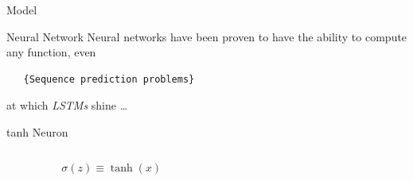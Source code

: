 \documentclass[10pt]{beamer}
\begin{document}
{
\begin{frame}[fragile]{Model}
 \par
\end{frame}
}

\begin{frame}[fragile]{Neural Network}
  Neural networks have been proven to have the ability to compute any function, even

  \begin{verbatim}   {Sequence prediction problems}\end{verbatim}

  at which \emph{LSTMs} shine \ldots
\end{frame}

\begin{frame}[fragile]{tanh Neuron}
\begin{columns}
    \begin{column}{.3\textwidth}
       \begin{equation*}   
  		 \sigma (z) \equiv  \tanh(x)
 		 \end{equation*}
    \end{column}
    \begin{column}{.6\textwidth}

		 \begin{figure}
\end{figure}

	  \end{column}
\end{columns}

\end{frame}
\end{document}
